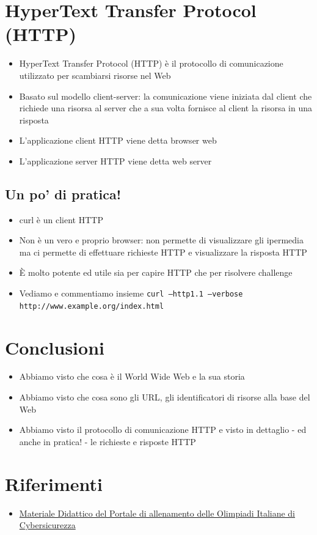\documentclass{beamer}
\newcommand{\command}[1]{\mbox{\texttt{#1}}}
\begin{document}
\section{HyperText Transfer Protocol (HTTP)}
\begin{frame}{\insertsection}
\begin{itemize}
\item \alert{HyperText Transfer Protocol (HTTP)} è il protocollo di
comunicazione utilizzato per scambiarsi risorse nel Web
\item Basato sul modello \alert{client-server}: la comunicazione viene iniziata
dal \alert{client} che \alert{richiede} una \alert{risorsa} al \alert{server} che a sua
volta fornisce al client la risorsa in una \alert{risposta}
\item L'applicazione client HTTP viene detta \alert{browser web}
\item L'applicazione server HTTP viene detta \alert{web server}
\end{itemize}
\end{frame}

\subsection*{Un po' di pratica!}
\begin{frame}{\insertsection}{\insertsubsection}
\begin{itemize}
\item \alert{curl} è un client \alert{HTTP}
\item Non è un vero e proprio browser: non permette di visualizzare gli
ipermedia ma ci permette di effettuare richieste HTTP e visualizzare la
risposta HTTP
\item È molto potente ed utile sia per capire HTTP che per risolvere challenge
\item Vediamo e commentiamo insieme
\small{\command{curl --http1.1 --verbose http://www.example.org/index.html}}
\end{itemize}
\end{frame}

\section{Conclusioni}
\begin{frame}{\insertsection}
\begin{itemize}
\item Abbiamo visto che cosa è il \alert{World Wide Web} e la sua storia
\item Abbiamo visto che cosa sono gli \alert{URL}, gli identificatori di risorse
alla base del Web
\item Abbiamo visto il protocollo di comunicazione \alert{HTTP} e visto in
dettaglio - ed anche in pratica! - le richieste e risposte HTTP
\end{itemize}
\end{frame}

\section{Riferimenti}
\begin{frame}{\insertsection}
\begin{itemize}
\item \href{https://training.olicyber.it/training}{Materiale Didattico del Portale di allenamento delle Olimpiadi Italiane di Cybersicurezza} 
\end{itemize}
\end{frame}
\end{document}
